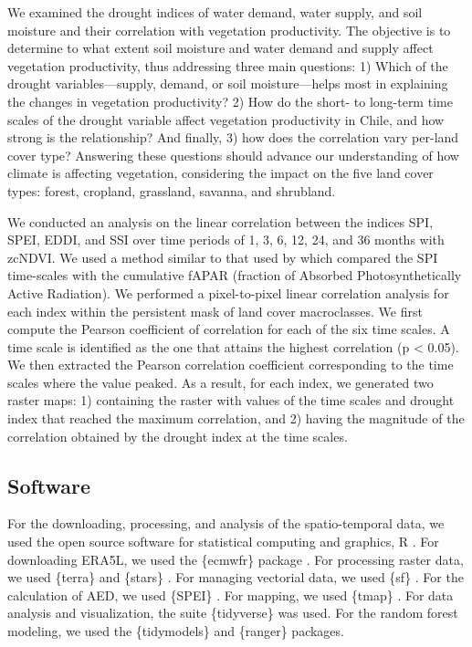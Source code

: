 \documentclass[
  authoryear,
  preprint,
  3p,
  onecolumn]{elsarticle}
\begin{document}
We examined the drought indices of water demand, water supply, and soil
moisture and their correlation with vegetation productivity. The
objective is to determine to what extent soil moisture and water demand
and supply affect vegetation productivity, thus addressing three main
questions: 1) Which of the drought variables---supply, demand, or soil
moisture---helps most in explaining the changes in vegetation
productivity? 2) How do the short- to long-term time scales of the
drought variable affect vegetation productivity in Chile, and how strong
is the relationship? And finally, 3) how does the correlation vary
per-land cover type? Answering these questions should advance our
understanding of how climate is affecting vegetation, considering the
impact on the five land cover types: forest, cropland, grassland,
savanna, and shrubland.

We conducted an analysis on the linear correlation between the indices
SPI, SPEI, EDDI, and SSI over time periods of 1, 3, 6, 12, 24, and 36
months with zcNDVI. We used a method similar to that used by
\citet{Meroni2017} which compared the SPI time-scales with the
cumulative fAPAR (fraction of Absorbed Photosynthetically Active
Radiation). We performed a pixel-to-pixel linear correlation analysis
for each index within the persistent mask of land cover macroclasses. We
first compute the Pearson coefficient of correlation for each of the six
time scales. A time scale is identified as the one that attains the
highest correlation (p \textless{} 0.05). We then extracted the Pearson
correlation coefficient corresponding to the time scales where the value
peaked. As a result, for each index, we generated two raster maps: 1)
containing the raster with values of the time scales and drought index
that reached the maximum correlation, and 2) having the magnitude of the
correlation obtained by the drought index at the time scales.

\subsection{Software}\label{software}

For the downloading, processing, and analysis of the spatio-temporal
data, we used the open source software for statistical computing and
graphics, R \citep{R2023}. For downloading ERA5L, we used the \{ecmwfr\}
package \citep{Hufkens2019}. For processing raster data, we used
\{terra\} \citep{Hijmans2023} and \{stars\} \citep{Pebesma2023}. For
managing vectorial data, we used \{sf\} \citep{Pebesma2018}. For the
calculation of AED, we used \{SPEI\} \citep{Bergueria2023}. For mapping,
we used \{tmap\} \citep{Tennekes2018}. For data analysis and
visualization, the suite \{tidyverse\} \citep{Wickham2019} was used. For
the random forest modeling, we used the \{tidymodels\} \citep{Kuhn2020}
and \{ranger\} \citep{Wright2017} packages.
\end{document}
